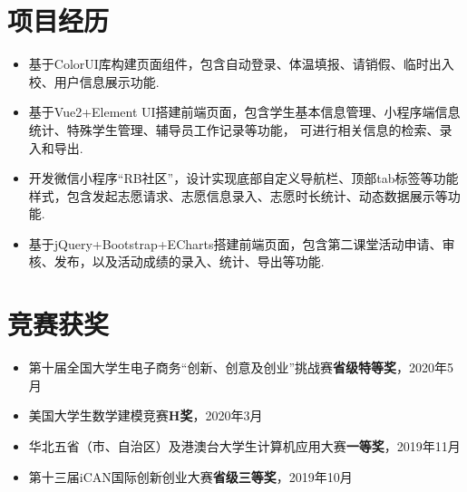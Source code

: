 \documentclass{resume}
\begin{document}
\begin{spacing}{1.2}
\vspace{0.2em}
\section{项目经历}

\begin{itemize}
  \item 基于ColorUI库构建页面组件，包含自动登录、体温填报、请销假、临时出入校、用户信息展示功能.
\end{itemize}

\begin{itemize}
  \item 基于Vue2+Element UI搭建前端页面，包含学生基本信息管理、小程序端信息统计、特殊学生管理、辅导员工作记录等功能， 可进行相关信息的检索、录入和导出.
\end{itemize}

\begin{itemize}
  \item 开发微信小程序“RB社区”，设计实现底部自定义导航栏、顶部tab标签等功能样式，包含发起志愿请求、志愿信息录入、志愿时长统计、动态数据展示等功能.
\end{itemize}

\begin{itemize}
  \item 基于jQuery+Bootstrap+ECharts搭建前端页面，包含第二课堂活动申请、审核、发布，以及活动成绩的录入、统计、导出等功能.
\end{itemize}

\vspace{0.2em}

\section{竞赛获奖}
\begin{itemize}[parsep=0.8ex]
  \item 第十届全国大学生电子商务“创新、创意及创业”挑战赛\textbf{省级特等奖}，2020年5月
  \item 美国大学生数学建模竞赛\textbf{H奖}，2020年3月
  \item 华北五省（市、自治区）及港澳台大学生计算机应用大赛\textbf{一等奖}，2019年11月
  \item 第十三届iCAN国际创新创业大赛\textbf{省级三等奖}，2019年10月
\end{itemize}



\end{spacing}
\end{document}
